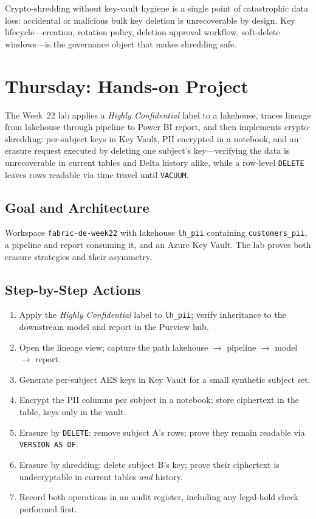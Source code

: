 \begin{pitfall}
Crypto-shredding without key-vault hygiene is a single point of catastrophic data loss: accidental or malicious bulk key deletion is unrecoverable by design. Key lifecycle---creation, rotation policy, deletion approval workflow, soft-delete windows---is the governance object that makes shredding safe.
\end{pitfall}

\section{Thursday: Hands-on Project}
The Week~22 lab applies a \emph{Highly Confidential} label to a lakehouse, traces lineage from lakehouse through pipeline to Power BI report, and then implements crypto-shredding: per-subject keys in Key Vault, PII encrypted in a notebook, and an erasure request executed by deleting one subject's key---verifying the data is unrecoverable in current tables and Delta history alike, while a row-level \texttt{DELETE} leaves rows readable via time travel until \texttt{VACUUM}.

\subsection{Goal and Architecture}
Workspace \texttt{fabric-de-week22} with lakehouse \texttt{lh\_pii} containing \texttt{customers\_pii}, a pipeline and report consuming it, and an Azure Key Vault. The lab proves both erasure strategies and their asymmetry.

\subsection{Step-by-Step Actions}
\begin{enumerate}
    \item Apply the \emph{Highly Confidential} label to \texttt{lh\_pii}; verify inheritance to the downstream model and report in the Purview hub.
    \item Open the lineage view; capture the path lakehouse $\rightarrow$ pipeline $\rightarrow$ model $\rightarrow$ report.
    \item Generate per-subject AES keys in Key Vault for a small synthetic subject set.
    \item Encrypt the PII columns per subject in a notebook; store ciphertext in the table, keys only in the vault.
    \item Erasure by \texttt{DELETE}: remove subject A's rows; prove they remain readable via \texttt{VERSION AS OF}.
    \item Erasure by shredding: delete subject B's key; prove their ciphertext is undecryptable in current tables \emph{and} history.
    \item Record both operations in an audit register, including any legal-hold check performed first.
\end{enumerate}

